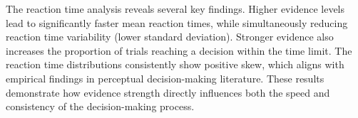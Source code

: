 \documentclass[11pt,a4paper]{article}
\begin{document}
The reaction time analysis reveals several key findings. Higher evidence levels lead to significantly faster mean reaction times, while simultaneously reducing reaction time variability (lower standard deviation). Stronger evidence also increases the proportion of trials reaching a decision within the time limit. The reaction time distributions consistently show positive skew, which aligns with empirical findings in perceptual decision-making literature. These results demonstrate how evidence strength directly influences both the speed and consistency of the decision-making process.






\end{document}
